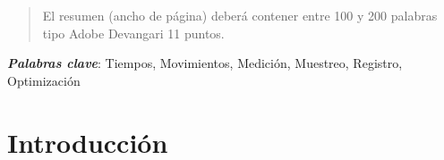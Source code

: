    \maketitle
    \thispagestyle{fancy}
    
    
    
    \begin{abstract}
    \noindent 
    El resumen (ancho de página) deberá contener entre 100 y 200 palabras tipo Adobe Devangari 11 puntos.
    
    \end{abstract}
    \textbf{\textit{Palabras clave}}: {Tiempos, Movimientos, Medición, Muestreo, Registro, Optimización} 
    
    \section{Introducción}
       
